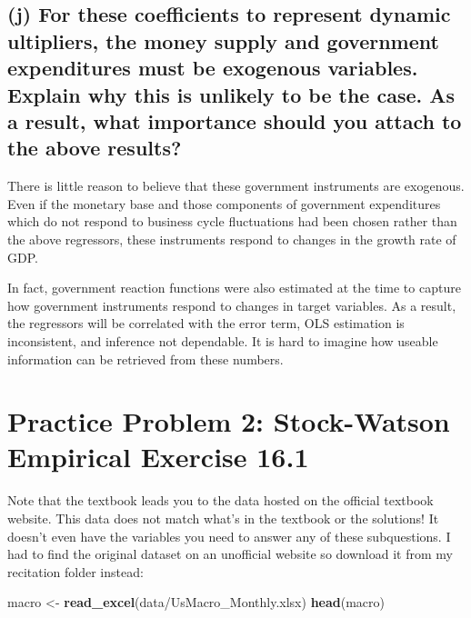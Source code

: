 \documentclass[
]{article}
\newenvironment{Shaded}{\begin{snugshade}}{\end{snugshade}}
\newcommand{\FunctionTok}[1]{\textcolor[rgb]{0.13,0.29,0.53}{\textbf{#1}}}
\newcommand{\NormalTok}[1]{#1}
\newcommand{\OtherTok}[1]{\textcolor[rgb]{0.56,0.35,0.01}{#1}}
\newcommand{\StringTok}[1]{\textcolor[rgb]{0.31,0.60,0.02}{#1}}
\begin{document}
\hypertarget{j-for-these-coefficients-to-represent-dynamic-ultipliers-the-money-supply-and-government-expenditures-must-be-exogenous-variables.-explain-why-this-is-unlikely-to-be-the-case.-as-a-result-what-importance-should-you-attach-to-the-above-results}{%
\subsection{(j) For these coefficients to represent dynamic ultipliers,
the money supply and government expenditures must be exogenous
variables. Explain why this is unlikely to be the case. As a result,
what importance should you attach to the above
results?}\label{j-for-these-coefficients-to-represent-dynamic-ultipliers-the-money-supply-and-government-expenditures-must-be-exogenous-variables.-explain-why-this-is-unlikely-to-be-the-case.-as-a-result-what-importance-should-you-attach-to-the-above-results}}

There is little reason to believe that these government instruments are
exogenous. Even if the monetary base and those components of government
expenditures which do not respond to business cycle fluctuations had
been chosen rather than the above regressors, these instruments respond
to changes in the growth rate of GDP.

In fact, government reaction functions were also estimated at the time
to capture how government instruments respond to changes in target
variables. As a result, the regressors will be correlated with the error
term, OLS estimation is inconsistent, and inference not dependable. It
is hard to imagine how useable information can be retrieved from these
numbers.

\hypertarget{practice-problem-2-stock-watson-empirical-exercise-16.1}{%
\section{Practice Problem 2: Stock-Watson Empirical Exercise
16.1}\label{practice-problem-2-stock-watson-empirical-exercise-16.1}}

Note that the textbook leads you to the data hosted on the official
textbook website. This data does not match what's in the textbook or the
solutions! It doesn't even have the variables you need to answer any of
these subquestions. I had to find the original dataset on an unofficial
website so download it from my recitation folder instead:

\begin{Shaded}
\begin{Highlighting}[]
\NormalTok{macro }\OtherTok{\textless{}{-}} \FunctionTok{read\_excel}\NormalTok{(}\StringTok{\textquotesingle{}data/UsMacro\_Monthly.xlsx\textquotesingle{}}\NormalTok{)}
\FunctionTok{head}\NormalTok{(macro)}
\end{Highlighting}
\end{Shaded}
\end{document}
